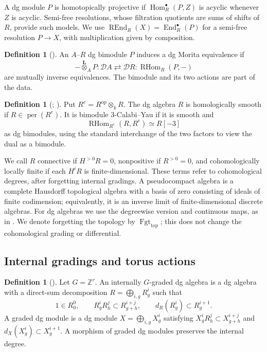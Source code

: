 \documentclass[12pt,a4paper,english,reqno]{amsart}
\theoremstyle{plain}
\theoremstyle{definition}
\newtheorem{dfn*}[thm]{Definition}
\numberwithin{equation}{section}
\def\Hom{\operatorname{Hom}}
\def\End{\operatorname{End}}
\def\perf{\operatorname{per}}
\def\calD{{\mathcal D}}
\def\bbZ{{\mathbb Z}}
\def\ox{\otimes}
\def\Lox{\overset{\mathbf{L}}{\otimes}}
\def\Ds{\bigoplus}
\newcommand{\Fgt}{\operatorname{Fgt}}
\def\RHom{\operatorname{RHom}}
\def\REnd{\operatorname{REnd}}
\begin{document}
A dg module $P$ is homotopically projective if
$\Hom_R^\bullet(P,Z)$ is acyclic whenever $Z$ is acyclic.
Semi-free resolutions, whose filtration quotients are sums of shifts
of $R$, provide such models. We use
$\REnd_R(X)=\End_R^\bullet(P)$ for a semi-free resolution $P\to X$,
with multiplication given by composition.

\begin{dfn*}[{\cite[Section 3.8]{KellerDG}}]\label{def:dg-morita}
An $A$--$R$ dg bimodule $P$ induces a dg Morita equivalence if
\[
 -\Lox_AP:\calD A\rightleftarrows\calD R:\RHom_R(P,-)
\]
are mutually inverse equivalences. The bimodule and its two actions
are part of the data.
\end{dfn*}

\begin{dfn*}[{\cite[Section 2]{Amiot}; \cite[Section 3.3]{Keller}}]\label{def:smooth-cy}
Put $R^e=R^{\mathrm{op}}\ox_kR$. The dg algebra $R$ is
homologically smooth if $R\in\perf(R^e)$. It is bimodule
$3$-Calabi--Yau if it is smooth and
\[
 \RHom_{R^e}(R,R^e)\simeq R[-3]
\]
as dg bimodules, using the standard interchange of the two factors
to view the dual as a bimodule.
\end{dfn*}

We call $R$ connective if $H^{>0}R=0$, nonpositive if $R^{>0}=0$,
and cohomologically locally finite if each $H^iR$ is finite-dimensional.
These terms refer to cohomological degrees, after forgetting internal
gradings. A pseudocompact algebra is a complete Hausdorff topological
algebra with a basis of zero consisting of ideals of finite codimension;
equivalently, it is an inverse limit of finite-dimensional discrete
algebras. For dg algebras we use the degreewise version and continuous
maps, as in \cite[Section 6 and Appendix A.2]{VdB}.
We denote forgetting the topology by $\Fgt_{\mathrm{top}}$;
this does not change the cohomological grading or differential.

\subsection{Internal gradings and torus actions}\label{subsec:gradings}

\begin{dfn*}[{\cite[Sections 4.1--4.2]{KalckYang}}]\label{def:internal-gradings}
Let $G=\bbZ^r$. An internally $G$-graded dg algebra is a dg algebra
with a direct-sum decomposition $R=\Ds_{i,g}R^i_g$ such that
\[
 1\in R^0_0,\qquad R^i_gR^j_h\subset R^{i+j}_{g+h},\qquad
 d_R(R^i_g)\subset R^{i+1}_g.
\]
A graded dg module is a dg module $X=\Ds_{i,g}X^i_g$ satisfying
$X^i_gR^j_h\subset X^{i+j}_{g+h}$ and
$d_X(X^i_g)\subset X^{i+1}_g$.
A morphism of graded dg modules preserves the internal degree.
\end{dfn*}
\end{document}
